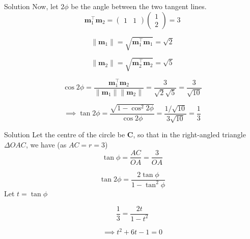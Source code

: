 \documentclass{beamer}
\let\vec\mathbf
\theoremstyle{remark}
\providecommand{\norm}[1]{\lVert#1\rVert}
\newcommand{\myvec}[1]{\ensuremath{\begin{pmatrix}#1\end{pmatrix}}}
\begin{document}
\begin{frame}{Solution}
Now, let $2\phi$ be the angle between the two tangent lines.
\begin{equation}
    \vec{m}_1^{\top}\vec{m}_2 = \myvec{1&1}\myvec{1\\2} = 3
\end{equation}

\begin{equation}
    \norm{\vec{m}_1} = \sqrt{\vec{m}_1^{\top}\vec{m}_1} = \sqrt{2}
\end{equation}

\begin{equation}
    \norm{\vec{m}_2} = \sqrt{\vec{m}_2^{\top}\vec{m}_2} = \sqrt{5}
\end{equation}

\begin{equation}
    \cos{2\phi} = \frac{\vec{m}_1^{\top}\vec{m}_2}{\norm{\vec{m}_1}\norm{\vec{m}_2}} = \frac{3}{\sqrt{2}\sqrt{5}} = \frac{3}{\sqrt{10}}
\end{equation}

\begin{equation}
    \implies \tan{2\phi} = \frac{\sqrt{1 - \cos^2{2\phi}}}{\cos{2\phi}} = \frac{1/\sqrt{10}}{3\sqrt{10}} = \frac{1}{3}
\end{equation}

\end{frame}

\begin{frame}{Solution}
Let the centre of the circle be $\vec{C}$, so that in the right-angled triangle $\Delta OAC$, we have (as $AC = r = 3$)
\begin{equation}
    \tan{\phi} = \frac{AC}{OA} = \frac{3}{OA}
\end{equation}

\begin{equation}
    \tan{2\phi} = \frac{2\tan{\phi}}{1 - \tan^2{\phi}}
\end{equation}
Let $t = \tan{\phi}$

\begin{equation}
    \frac{1}{3} = \frac{2t}{1 - t^2}
\end{equation}

\begin{equation}
    \implies t^2 + 6t -1 = 0
\end{equation}
\end{frame}
\end{document}

